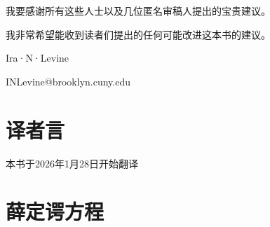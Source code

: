 \documentclass[12pt,a4paper,openany]{ctexbook}
\begin{document}
\begin{flushleft}
\noindent 我要感谢所有这些人士以及几位匿名审稿人提出的宝贵建议。

我非常希望能收到读者们提出的任何可能改进这本书的建议。
\begin{flushright}
Ira·N·Levine

INLevine@brooklyn.cuny.edu
\end{flushright}
\end{flushleft}
\newpage
\chapter*{译者言}
\begin{flushleft}
本书于2026年1月28日开始翻译
\end{flushleft}

\chapter{薛定谔方程}
\end{document}

